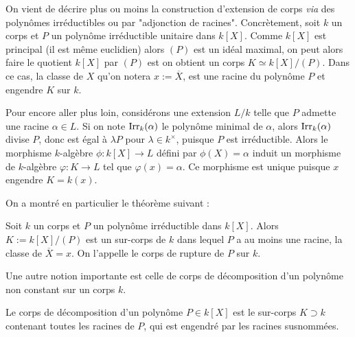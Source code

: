 \documentclass[a4paper]{article} %
\numberwithin{equation}{section}
\newcommand\Irr[2]{\textup{Irr}_{#1}(#2)}
\begin{document}
On vient de décrire plus ou moins la construction d'extension de corps 
\textit{via} des polynômes irréductibles ou par "adjonction de racines". 
Concrètement, soit $k$ un corps et $P$ un polynôme irréductible unitaire 
dans $k[X]$. Comme $k[X]$ est principal (il est même euclidien) alors $(P)$ est 
un idéal maximal, on peut alors faire le quotient $k[X]$ par $(P)$ est on 
obtient un corps $K \simeq k[X]/(P)$. Dans ce cas, la classe de $X$ qu'on notera
$x := \overline{X}$, est une racine du polynôme $P$ et engendre $K$ sur $k$.\par
Pour encore aller plus loin, considérons une extension $L/k$ telle que $P$ 
admette une racine $\alpha\in L$. Si on note $\Irr{k}{\alpha}$ le polynôme 
minimal de $\alpha$, alors $\Irr{k}{\alpha}$ divise $P$, donc est égal à 
$\lambda P$ pour $\lambda\in k^{\times}$, puisque $P$ est irréductible. Alors 
le morphisme $k$-algèbre $\phi : k[X] \to L$ défini par $\phi(X) = \alpha$ 
induit un morphisme de $k$-algèbre $\varphi : K \to L$ tel que $\varphi(x) 
= \alpha$. Ce morphisme est unique puisque $x$ engendre $K = k(x)$.\par
\vspace{0.3cm}
On a montré en particulier le théorème suivant :

\begin{thm}
Soit $k$ un corps et $P$ un polynôme irréductible dans $k[X]$. Alors $K := 
k[X]/(P)$ est un sur-corps de $k$ dans lequel $P$ a au moins une racine, la 
classe de $\overline{X} = x$. On l'appelle le corps de rupture de $P$ sur 
$k$.\par
\end{thm}

Une autre notion importante est celle de corps de décomposition d'un polynôme 
non constant sur un corps $k$.

\begin{defn}
\label{defdec}
Le corps de décomposition d'un polynôme $P\in k[X]$ est le sur-corps $K \supset 
k$ contenant toutes les racines de $P$, qui est engendré par les racines 
susnommées.
\end{defn}
\end{document}
